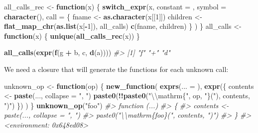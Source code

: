 \documentclass[]{book}
\newenvironment{Shaded}{\begin{snugshade}}{\end{snugshade}}
\newcommand{\CharTok}[1]{\textcolor[rgb]{0.5,0.5,0.5}{#1}}
\newcommand{\CommentTok}[1]{\textcolor[rgb]{0.37,0.37,0.37}{\textit{#1}}}
\newcommand{\ControlFlowTok}[1]{\textcolor[rgb]{0.27,0.27,0.27}{\textbf{#1}}}
\newcommand{\DataTypeTok}[1]{\textcolor[rgb]{0.27,0.27,0.27}{#1}}
\newcommand{\DecValTok}[1]{\textcolor[rgb]{0.06,0.06,0.06}{#1}}
\newcommand{\KeywordTok}[1]{\textcolor[rgb]{0.27,0.27,0.27}{\textbf{#1}}}
\newcommand{\NormalTok}[1]{#1}
\newcommand{\OperatorTok}[1]{\textcolor[rgb]{0.43,0.43,0.43}{\textbf{#1}}}
\newcommand{\StringTok}[1]{\textcolor[rgb]{0.5,0.5,0.5}{#1}}
\begin{document}
\begin{Shaded}
\begin{Highlighting}[]
\NormalTok{all_calls_rec <-}\StringTok{ }\ControlFlowTok{function}\NormalTok{(x) \{}
  \KeywordTok{switch_expr}\NormalTok{(x,}
    \DataTypeTok{constant =}\NormalTok{ ,}
    \DataTypeTok{symbol =}   \KeywordTok{character}\NormalTok{(),}
    \DataTypeTok{call =}\NormalTok{ \{}
\NormalTok{      fname <-}\StringTok{ }\KeywordTok{as.character}\NormalTok{(x[[}\DecValTok{1}\NormalTok{]])}
\NormalTok{      children <-}\StringTok{ }\KeywordTok{flat_map_chr}\NormalTok{(}\KeywordTok{as.list}\NormalTok{(x[}\OperatorTok{-}\DecValTok{1}\NormalTok{]), all_calls)}
      \KeywordTok{c}\NormalTok{(fname, children)}
\NormalTok{    \}}
\NormalTok{  )}
\NormalTok{\}}
\NormalTok{all_calls <-}\StringTok{ }\ControlFlowTok{function}\NormalTok{(x) \{}
  \KeywordTok{unique}\NormalTok{(}\KeywordTok{all_calls_rec}\NormalTok{(x))}
\NormalTok{\}}

\KeywordTok{all_calls}\NormalTok{(}\KeywordTok{expr}\NormalTok{(}\KeywordTok{f}\NormalTok{(g }\OperatorTok{+}\StringTok{ }\NormalTok{b, c, }\KeywordTok{d}\NormalTok{(a))))}
\CommentTok{#> [1] "f" "+" "d"}
\end{Highlighting}
\end{Shaded}

We need a closure that will generate the functions for each unknown call:

\begin{Shaded}
\begin{Highlighting}[]
\NormalTok{unknown_op <-}\StringTok{ }\ControlFlowTok{function}\NormalTok{(op) \{}
  \KeywordTok{new_function}\NormalTok{(}
    \KeywordTok{exprs}\NormalTok{(}\DataTypeTok{... =}\NormalTok{ ),}
    \KeywordTok{expr}\NormalTok{(\{}
\NormalTok{      contents <-}\StringTok{ }\KeywordTok{paste}\NormalTok{(..., }\DataTypeTok{collapse =} \StringTok{", "}\NormalTok{)}
      \KeywordTok{paste0}\NormalTok{(}\OperatorTok{!!}\KeywordTok{paste0}\NormalTok{(}\StringTok{"}\CharTok{\textbackslash{}\textbackslash{}}\StringTok{mathrm\{"}\NormalTok{, op, }\StringTok{"\}("}\NormalTok{), contents, }\StringTok{")"}\NormalTok{)}
\NormalTok{    \})}
\NormalTok{  )}
\NormalTok{\}}
\KeywordTok{unknown_op}\NormalTok{(}\StringTok{"foo"}\NormalTok{)}
\CommentTok{#> function (...) }
\CommentTok{#> \{}
\CommentTok{#>     contents <- paste(..., collapse = ", ")}
\CommentTok{#>     paste0("\textbackslash{}\textbackslash{}mathrm\{foo\}(", contents, ")")}
\CommentTok{#> \}}
\CommentTok{#> <environment: 0x648ed08>}
\end{Highlighting}
\end{Shaded}
\end{document}
